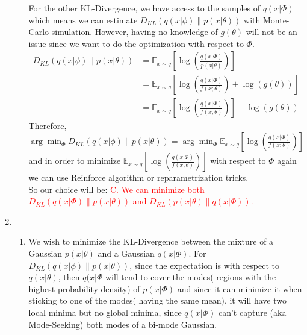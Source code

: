\documentclass{article}
\begin{document}
\begin{enumerate}
\begin{enumerate}
        For the other KL-Divergence, we have access to the samples of $q(x | \Phi)$ which means we can estimate $D_{KL} (q(x | \phi) \parallel p(x | \theta))$ with Monte-Carlo simulation. However, having no knowledge of  $g(\theta)$ will not be an issue since we want to do the optimization with respect to $\Phi$.
        \begin{equation*}
            \begin{aligned}
                D_{KL} (q(x | \phi) \parallel p(x | \theta)) &= \mathbb{E}_{x \sim q} \left[ \log \left( \frac{ q(x | \Phi)}{p(x | \theta)} \right) \right] \\
                &= \mathbb{E}_{x \sim q} \left[ \log \left( \frac{ q(x | \Phi)}{f(x; \theta)} \right) + \log \left( g(\theta) \right) \right] \\
                &= \mathbb{E}_{x \sim q} \left[ \log \left( \frac{ q(x | \Phi)}{f(x; \theta)} \right) \right] + \log \left( g(\theta) \right) 
            \end{aligned}
        \end{equation*}
        Therefore, $\arg \min_\Phi D_{KL} (q(x | \phi) \parallel p(x | \theta)) =
        \arg \min_\Phi \mathbb{E}_{x \sim q} \left[ \log \left( \frac{ q(x | \Phi)}{f(x; \theta)} \right) \right]
        $ and in order to minimize $\mathbb{E}_{x \sim q} \left[ \log \left( \frac{ q(x | \Phi)}{f(x; \theta)} \right) \right]$ 
        with respect to $\Phi$ again
        we can use Reinforce algorithm or reparametrization tricks.
        \\
        So our choice will be:
        \textcolor{red}{C. We can minimize both $D_{KL} (q(x | \Phi) \parallel p(x | \theta))$ and $D_{KL} (p(x | \theta) \parallel q(x | \Phi))$.}
        \end{enumerate}
    \item 
    \begin{enumerate}
        \item We wish to minimize the KL-Divergence between the mixture of a Gaussian $p(x|\theta)$ and a Gaussian $q(x|\Phi)$. For$D_{KL} (q(x | \phi) \parallel p(x | \theta))$, since the expectation is with respect to $q(x|\theta)$, then $q(x|\Phi$ will tend to cover the modes( regions with the highest probability density) of $p(x|\Phi)$ and since it can minimize it when sticking to one of the modes( having the same mean), it will have two local minima but no global minima, since $q(x|\Phi)$ can't capture (aka Mode-Seeking) both modes of a bi-mode Gaussian.

\end{enumerate}
\end{enumerate}
\end{document}
